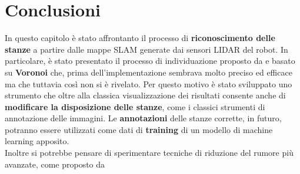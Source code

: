 \section{Conclusioni}
In questo capitolo è stato affrontanto il processo di \textbf{riconoscimento delle stanze} a partire dalle mappe SLAM generate dai sensori LIDAR del robot. In particolare, è stato presentato il processo di individuazione proposto da \cite{mora} e basato su \textbf{Voronoi} \cite{thrun} che, prima dell'implementazione sembrava molto preciso ed efficace ma che tuttavia così non si è rivelato. Per questo motivo è stato sviluppato uno strumento che oltre alla classica visualizzazione dei risultati consente anche di \textbf{modificare la disposizione delle stanze}, come i classici strumenti di annotazione delle immagini. Le \textbf{annotazioni} delle stanze corrette, in futuro, potranno essere utilizzati come dati di \textbf{training} di un modello di machine learning apposito.\\Inoltre si potrebbe pensare di sperimentare tecniche di riduzione del rumore più avanzate, come proposto da \cite{rose}
